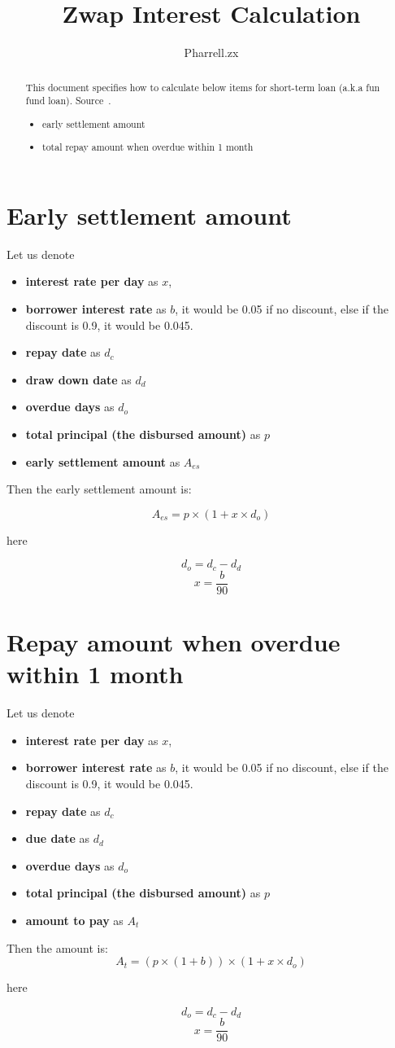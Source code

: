 \documentclass[a4paper]{article}
\title{Zwap Interest Calculation}
\author{Pharrell.zx}
\begin{document}
\maketitle

\begin{abstract}
This document specifies how to calculate below items for short-term loan (a.k.a fun fund loan).
Source~\cite{RN001}.
\begin{itemize}
      \item early settlement amount
      \item total repay amount when overdue within 1 month
\end{itemize}
\end{abstract}

\section{Early settlement amount}
Let us denote
\begin{itemize}
      \item \textbf{interest rate per day} as \(x\),
      \item \textbf{borrower interest rate} as \(b\), it would be 0.05 if no discount, else if the discount is 0.9, it would be 0.045.
      \item \textbf{repay date} as \(d_c\)
      \item \textbf{draw down date} as \(d_d\)
      \item \textbf{overdue days} as \(d_o\)
      \item \textbf{total principal (the disbursed amount)} as \(p\)
      \item \textbf{early settlement amount} as \(A_{es}\)
\end{itemize}

Then the early settlement amount is: 

\[A_{es} = p\times(1+x\times d_o)\]

here

\[d_o = d_c - d_d\]
\[x =\frac{b}{90}\]

\section{Repay amount when overdue within 1 month}

Let us denote
\begin{itemize}
      \item \textbf{interest rate per day} as \(x\),
      \item \textbf{borrower interest rate} as \(b\), it would be 0.05 if no discount, else if the discount is 0.9, it would be 0.045.
      \item \textbf{repay date} as \(d_c\)
      \item \textbf{due date} as \(d_d\)
      \item \textbf{overdue days} as \(d_o\)
      \item \textbf{total principal (the disbursed amount)} as \(p\)
      \item \textbf{amount to pay} as \(A_{t}\)
\end{itemize}

Then the amount is: 
\[A_{t} = (p\times(1+b))\times(1+x\times d_o)\]

here

\[d_o = d_c - d_d\]
\[x =\frac{b}{90}\]


% 
% 
\printbibliography[heading=bibintoc]
\end{document}
